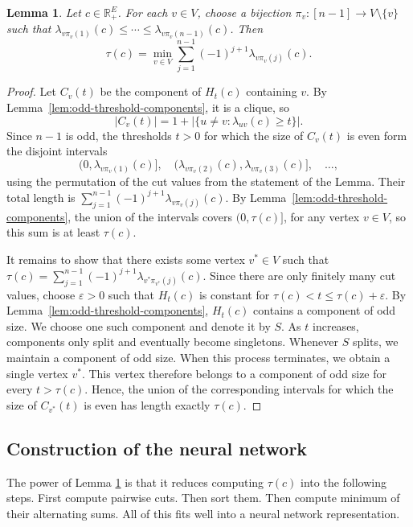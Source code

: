 \documentclass[centering,11pt,reqno]{amsart}
\newtheorem{lem}[theorem]{Lemma}
\theoremstyle{definition}
\newcommand{\R}{\mathbb{R}}
\def\R{\mathbb{R}}
\begin{document}
\begin{lem}\label{lem:odd-parity-identity}
    Let $c\in\R_+^E$. For each $v\in V$, choose a bijection
    $\pi_v:[n-1]\to V\setminus\{v\}$ such that $\lambda_{v\pi_v(1)}(c)\le\cdots\le\lambda_{v\pi_v(n-1)}(c)$.
    Then
    \[
        \tau(c)=\min_{v\in V}\sum_{j=1}^{n-1}(-1)^{j+1}\lambda_{v\pi_v(j)}(c).
    \]
\end{lem}
\begin{proof}
    Let $C_v(t)$ be the component of $H_t(c)$ containing $v$.
    By Lemma~\ref{lem:odd-threshold-components}, it is a clique, so
    \[
        |C_v(t)|=1+\bigl|\{u\ne v:\lambda_{uv}(c)\ge t\}\bigr|.
    \]
    Since $n-1$ is odd, the thresholds $t>0$ for which the size of $C_v(t)$ is even form the disjoint intervals
    \[
        (0,\lambda_{v\pi_v(1)}(c)],\quad
        (\lambda_{v\pi_v(2)}(c),\lambda_{v\pi_v(3)}(c)],\quad\ldots,
    \]
    using the permutation of the cut values from the statement of the Lemma.
    Their total length is $\sum_{j=1}^{n-1}(-1)^{j+1}\lambda_{v\pi_v(j)}(c)$.
    By Lemma~\ref{lem:odd-threshold-components}, the union of the intervals covers
    $(0,\tau(c)]$, for any vertex $v\in V$, so this sum is at least $\tau(c)$.

    It remains to show that there exists some vertex $v^*\in V$ such that $\tau(c)=\sum_{j=1}^{n-1}(-1)^{j+1}\lambda_{v^*\pi_{v^*}(j)}(c)$.
    Since there are only finitely many cut values, choose $\varepsilon>0$
    such that $H_t(c)$ is constant for
    $\tau(c)<t\le\tau(c)+\varepsilon$.
    By Lemma~\ref{lem:odd-threshold-components}, $H_t(c)$ contains a component of odd size. 
    We choose one such component and denote it by $S$.
    As $t$ increases, components only split and eventually become singletons.
    Whenever $S$ splits, we maintain a component of odd size.
    When this process terminates, we obtain a single vertex $v^*$.
    This vertex therefore belongs to a component of odd size for every $t>\tau(c)$.
    Hence, the union of the corresponding intervals for which the size of $C_{v^*}(t)$ is even has length exactly $\tau(c)$.
\end{proof}

\subsection{Construction of the neural network}

The power of Lemma \ref{lem:odd-parity-identity} is that it reduces computing $\tau(c)$ into the following steps. First compute pairwise cuts. Then sort them. Then compute minimum of their alternating sums. All of this fits well into a neural network representation.
\end{document}
